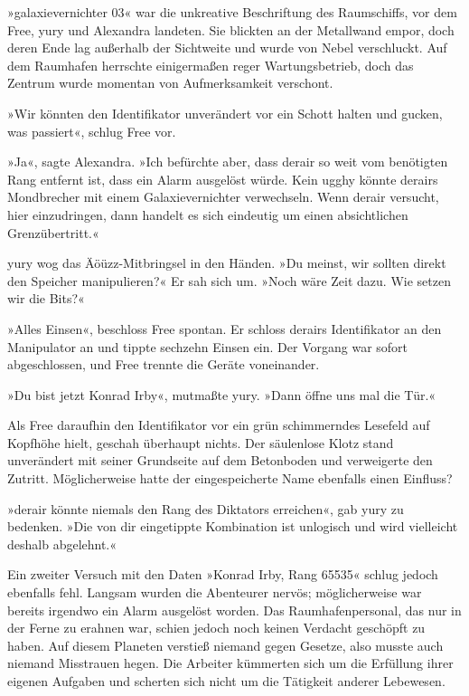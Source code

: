 »galaxievernichter 03« war die unkreative Beschriftung des Raumschiffs, vor dem Free, yury und Alexandra landeten. Sie blickten an der Metallwand empor, doch deren Ende lag außerhalb der Sichtweite und wurde von Nebel verschluckt. Auf dem Raumhafen herrschte einigermaßen reger Wartungsbetrieb, doch das Zentrum wurde momentan von Aufmerksamkeit verschont.

»Wir könnten den Identifikator unverändert vor ein Schott halten und gucken, was passiert«, schlug Free vor.

»Ja«, sagte Alexandra. »Ich befürchte aber, dass derair so weit vom benötigten Rang entfernt ist, dass ein Alarm ausgelöst würde. Kein ugghy könnte derairs Mondbrecher mit einem Galaxievernichter verwechseln. Wenn derair versucht, hier einzudringen, dann handelt es sich eindeutig um einen absichtlichen Grenzübertritt.«

yury wog das Äöüzz-Mitbringsel in den Händen. »Du meinst, wir sollten direkt den Speicher manipulieren?« Er sah sich um. »Noch wäre Zeit dazu. Wie setzen wir die Bits?«

»Alles Einsen«, beschloss Free spontan. Er schloss derairs Identifikator an den Manipulator an und tippte sechzehn Einsen ein. Der Vorgang war sofort abgeschlossen, und Free trennte die Geräte voneinander.

»Du bist jetzt Konrad Irby«, mutmaßte yury. »Dann öffne uns mal die Tür.«

Als Free daraufhin den Identifikator vor ein grün schimmerndes Lesefeld auf Kopfhöhe hielt, geschah überhaupt nichts. Der säulenlose Klotz stand unverändert mit seiner Grundseite auf dem Betonboden und verweigerte den Zutritt. Möglicherweise hatte der eingespeicherte Name ebenfalls einen Einfluss?

»derair könnte niemals den Rang des Diktators erreichen«, gab yury zu bedenken. »Die von dir eingetippte Kombination ist unlogisch und wird vielleicht deshalb abgelehnt.«

Ein zweiter Versuch mit den Daten »Konrad Irby, Rang 65535« schlug jedoch ebenfalls fehl. Langsam wurden die Abenteurer nervös; möglicherweise war bereits irgendwo ein Alarm ausgelöst worden. Das Raumhafenpersonal, das nur in der Ferne zu erahnen war, schien jedoch noch keinen Verdacht geschöpft zu haben. Auf diesem Planeten verstieß niemand gegen Gesetze, also musste auch niemand Misstrauen hegen. Die Arbeiter kümmerten sich um die Erfüllung ihrer eigenen Aufgaben und scherten sich nicht um die Tätigkeit anderer Lebewesen.

